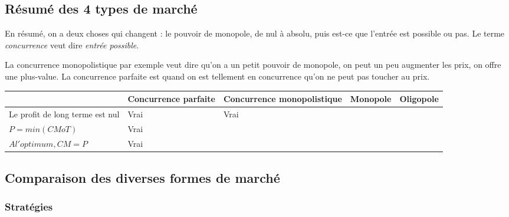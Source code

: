 \subsection{Résumé des 4 types de marché}
En résumé, on a deux choses qui changent : le pouvoir de monopole, de nul à absolu, puis est-ce que l'entrée est possible ou pas. Le terme \textit{concurrence} veut dire \textit{entrée possible}.

La concurrence monopolistique par exemple veut dire qu'on a un petit pouvoir de monopole, on peut un peu augmenter
les prix, on offre une plus-value. La concurrence parfaite est quand on est tellement en concurrence qu'on ne peut pas toucher au prix.



\begin{center}
\begin{tabularx}{1.0\linewidth}{@{}|l|Y|Y|Y|Y|@{}}

\hline
                                & Concurrence parfaite      & Concurrence monopolistique & Monopole & Oligopole\\\hline
Le profit de long terme est nul &  Vrai &  Vrai  &          &          \\\hline
$P = min(CMoT)$                 &  Vrai &                            &          &          \\\hline
$A l'optimum, CM=P$             &  Vrai &                            &          &          \\\hline

        
\end{tabularx}
\end{center}


\subsection{Comparaison des diverses formes de marché}



\subsubsection{Stratégies}


